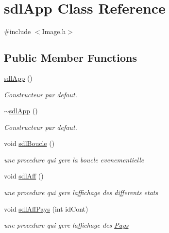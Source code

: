 \hypertarget{classsdlApp}{}\section{sdl\+App Class Reference}
\label{classsdlApp}


{\ttfamily \#include $<$Image.\+h$>$}

\subsection*{Public Member Functions}
\begin{DoxyCompactItemize}
\item 
\mbox{\label{classsdlApp_a0046aa4ab3656c5ce0efd9a93f797b16}} 
\mbox{\hyperlink{classsdlApp_a0046aa4ab3656c5ce0efd9a93f797b16}{sdl\+App}} ()
\begin{DoxyCompactList}\small\item\em Constructeur par defaut. \end{DoxyCompactList}\item 
\mbox{\label{classsdlApp_a301afe99243cbc29effd0e0f4945ac84}} 
\mbox{\hyperlink{classsdlApp_a301afe99243cbc29effd0e0f4945ac84}{$\sim$sdl\+App}} ()
\begin{DoxyCompactList}\small\item\em Constructeur par defaut. \end{DoxyCompactList}\item 
void \mbox{\hyperlink{classsdlApp_a535e9ab849788dcc9028383b64990744}{sdl\+Boucle}} ()
\begin{DoxyCompactList}\small\item\em une procedure qui gere la boucle evenementielle \end{DoxyCompactList}\item 
void \mbox{\hyperlink{classsdlApp_a4efd1a7e53fc14b582d5fe0cf2dddc0b}{sdl\+Aff}} ()
\begin{DoxyCompactList}\small\item\em une procedure qui gere l\textquotesingle{}affichage des differents etats \end{DoxyCompactList}\item 
void \mbox{\hyperlink{classsdlApp_a02c12de36e42e60a8978458ef62fa762}{sdl\+Aff\+Pays}} (int id\+Cont)
\begin{DoxyCompactList}\small\item\em une procedure qui gere l\textquotesingle{}affichage des \mbox{\hyperlink{classPays}{Pays}} \end{DoxyCompactList}\item 

\end{DoxyCompactItemize}
